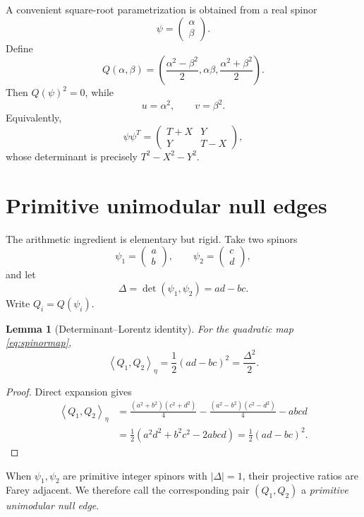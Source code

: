 \documentclass[11pt]{article}
\newtheorem{lemma}[theorem]{Lemma}
\theoremstyle{remark}
\newcommand{\ip}[2]{\left\langle #1,#2\right\rangle_\eta}
\begin{document}
A convenient square-root parametrization is obtained from a real spinor
\[
\psi=
\begin{pmatrix}\alpha\\ \beta\end{pmatrix}.
\]
Define
\begin{equation}
Q(\alpha,\beta)
=
\left(
\frac{\alpha^2-\beta^2}{2},
\alpha\beta,
\frac{\alpha^2+\beta^2}{2}
\right).
\label{eq:spinormap}
\end{equation}
Then $Q(\psi)^2=0$, while
\[
u=\alpha^2,\qquad v=\beta^2.
\]
Equivalently,
\[
\psi\psi^T
=
\begin{pmatrix}
T+X&Y\\
Y&T-X
\end{pmatrix},
\]
whose determinant is precisely $T^2-X^2-Y^2$.

\section{Primitive unimodular null edges}

The arithmetic ingredient is elementary but rigid.  Take two spinors
\[
\psi_1=\begin{pmatrix}a\\b\end{pmatrix},
\qquad
\psi_2=\begin{pmatrix}c\\d\end{pmatrix},
\]
and let
\[
\Delta=\det(\psi_1,\psi_2)=ad-bc.
\]
Write $Q_i=Q(\psi_i)$.

\begin{lemma}[Determinant--Lorentz identity]
\label{lem:detlor}
For the quadratic map \eqref{eq:spinormap},
\[
\boxed{
\ip{Q_1}{Q_2}
=
\frac12(ad-bc)^2
=
\frac{\Delta^2}{2}.
}
\]
\end{lemma}

\begin{proof}
Direct expansion gives
\begin{align*}
\ip{Q_1}{Q_2}
&=
\frac{(a^2+b^2)(c^2+d^2)}{4}
-\frac{(a^2-b^2)(c^2-d^2)}{4}
-abcd\\
&=
\frac12(a^2d^2+b^2c^2-2abcd)
=
\frac12(ad-bc)^2.
\end{align*}
\end{proof}

When $\psi_1,\psi_2$ are primitive integer spinors with $|\Delta|=1$, their projective ratios are Farey adjacent.  We therefore call the corresponding pair $(Q_1,Q_2)$ a \emph{primitive unimodular null edge}.
\end{document}
